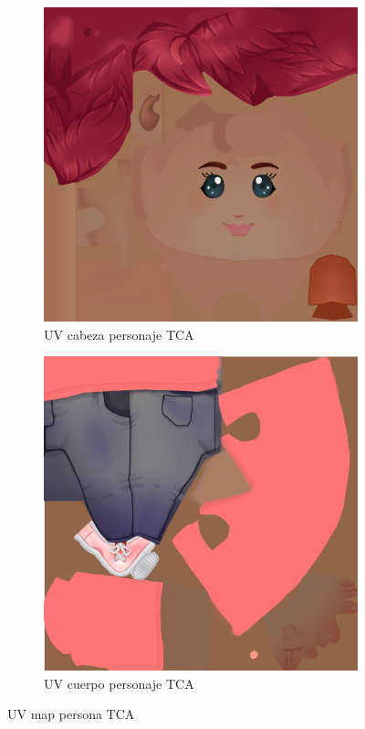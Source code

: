 \documentclass[12pt, a4paper,twoside,titlepage]{book}
\begin{document}
 \begin{figure}
\centering
\begin{subfigure}{.5\textwidth}
  \centering
  \includegraphics[width=.95\linewidth]{TGF/Artes/TCA_head.png}
  \caption{UV cabeza personaje TCA}
\end{subfigure}%
\begin{subfigure}{.5\textwidth}
  \centering
  \includegraphics[width=.95\linewidth]{TGF/Artes/TCA_body.png}
  \caption{UV cuerpo personaje TCA}
\end{subfigure}
\caption{UV map persona TCA}
\label{fig:ArtesTCA1}
\end{figure}
\end{document}
